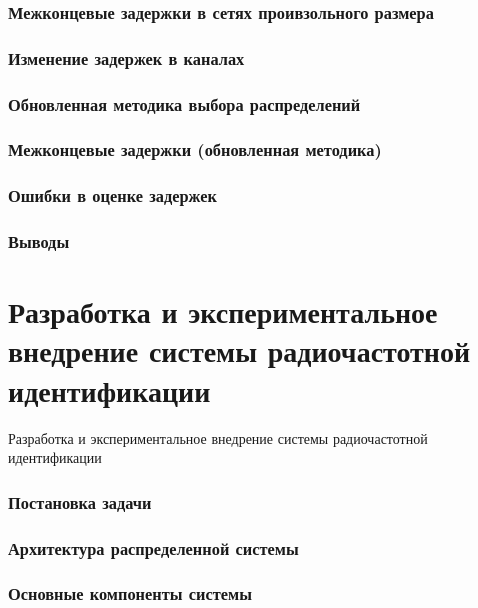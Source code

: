 \begin{frame}
    \frametitle{Межконцевые задержки в сетях проивзольного размера}
\end{frame}

\begin{frame}
    \frametitle{Изменение задержек в каналах}
\end{frame}

\begin{frame}
    \frametitle{Обновленная методика выбора распределений}
\end{frame}

\begin{frame}
    \frametitle{Межконцевые задержки (обновленная методика)}
\end{frame}

\begin{frame}
    \frametitle{Ошибки в оценке задержек}
\end{frame}

\begin{frame}
    \frametitle{Выводы}
\end{frame}


\section{Разработка и экспериментальное внедрение системы радиочастотной идентификации}
\begin{frame}
    \begin{center}
        \Huge
        Разработка и экспериментальное внедрение системы радиочастотной идентификации
    \end{center}
\end{frame}

\begin{frame}
    \frametitle{Постановка задачи}
\end{frame}

\begin{frame}
    \frametitle{Архитектура распределенной системы}
\end{frame}

\begin{frame}
    \frametitle{Основные компоненты системы}
\end{frame}

